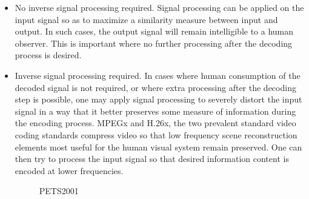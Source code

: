 \documentclass{article}
\begin{document}
\begin{itemize}
\item {No inverse signal processing required.}  Signal processing can be applied on the input signal so as to maximize a similarity measure between input and output.  In such cases, the output signal will remain intelligible to a human observer.  This is important where no further processing after the decoding process is desired.

\item {Inverse signal processing required.}  In cases where human consumption of the decoded signal is not required, or where extra processing after the decoding step is possible, one may apply signal processing to severely distort the input signal in a way that it better preserves some measure of information during the encoding process.  MPEGx and H.26x, the two prevalent standard video coding standards compress video so that low frequency scene reconstruction elements most useful for the human visual system remain preserved.  One can then try to process the input signal so that desired information content is encoded at lower frequencies.

\begin{figure}%
			\centering

			\caption{PETS2001} 	
			\label{fig:PicsPETS2001}	
\end{figure}


\end{itemize}
\end{document}
